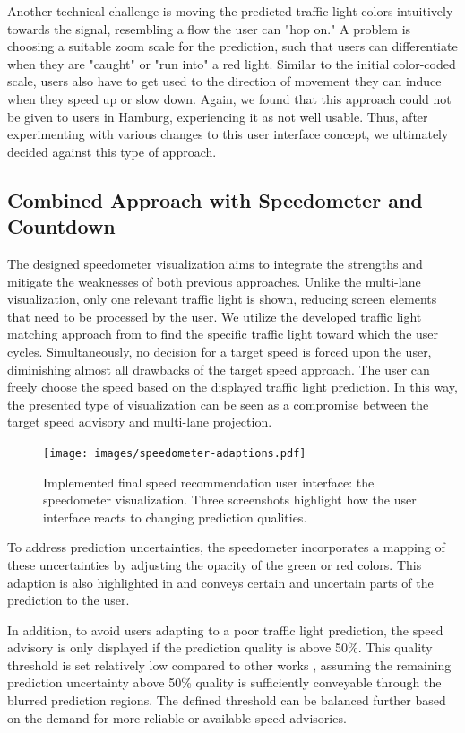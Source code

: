 Another technical challenge is moving the predicted traffic light colors intuitively towards the signal, resembling a flow the user can "hop on." A problem is choosing a suitable zoom scale for the prediction, such that users can differentiate when they are "caught" or "run into" a red light. Similar to the initial color-coded scale, users also have to get used to the direction of movement they can induce when they speed up or slow down. Again, we found that this approach could not be given to users in Hamburg, experiencing it as not well usable. Thus, after experimenting with various changes to this user interface concept, we ultimately decided against this type of approach.

\subsection{Combined Approach with Speedometer and Countdown}

The designed speedometer visualization aims to integrate the strengths and mitigate the weaknesses of both previous approaches. Unlike the multi-lane visualization, only one relevant traffic light is shown, reducing screen elements that need to be processed by the user. We utilize the developed traffic light matching approach from  to find the specific traffic light toward which the user cycles. Simultaneously, no decision for a target speed is forced upon the user, diminishing almost all drawbacks of the target speed approach. The user can freely choose the speed based on the displayed traffic light prediction. In this way, the presented type of visualization can be seen as a compromise between the target speed advisory and multi-lane projection.

\begin{figure}[t]
\centering
\texttt{[image: images/speedometer-adaptions.pdf]}
\caption{Implemented final speed recommendation user interface: the speedometer visualization. Three screenshots highlight how the user interface reacts to changing prediction qualities.}
\label{fig:speedometer-adaptions}
\end{figure}

To address prediction uncertainties, the speedometer incorporates a mapping of these uncertainties by adjusting the opacity of the green or red colors. This adaption is also highlighted in  and conveys certain and uncertain parts of the prediction to the user. 

In addition, to avoid users adapting to a poor traffic light prediction, the speed advisory is only displayed if the prediction quality is above 50\%. This quality threshold is set relatively low compared to other works \cite{protschky_extensive_2014, protschky_adaptive_2014}, assuming the remaining prediction uncertainty above 50\% quality is sufficiently conveyable through the blurred prediction regions. The defined threshold can be balanced further based on the demand for more reliable or available speed advisories. 

